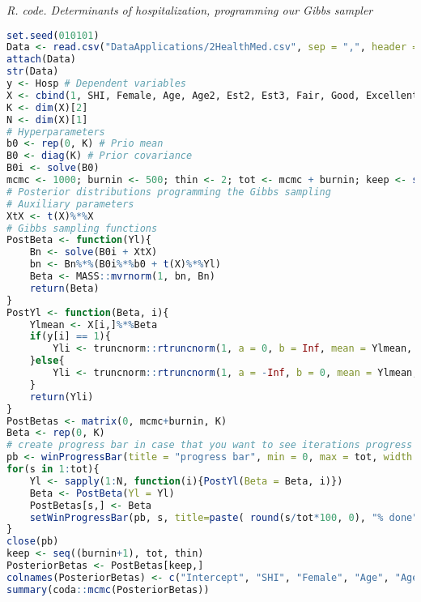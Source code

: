 \begin{enumerate}[leftmargin=*]
\begin{tcolorbox}[enhanced,width=4.67in,center upper,
	fontupper=\large\bfseries,drop shadow southwest,sharp corners]
	\textit{R. code. Determinants of hospitalization, programming our Gibbs sampler}
	\begin{VF}
		\begin{lstlisting}[language=R]
set.seed(010101)
Data <- read.csv("DataApplications/2HealthMed.csv", sep = ",", header = TRUE, fileEncoding = "latin1")
attach(Data)
str(Data)
y <- Hosp # Dependent variables
X <- cbind(1, SHI, Female, Age, Age2, Est2, Est3, Fair, Good, Excellent) # Regressors
K <- dim(X)[2] 
N <- dim(X)[1]
# Hyperparameters
b0 <- rep(0, K) # Prio mean
B0 <- diag(K) # Prior covariance
B0i <- solve(B0)
mcmc <- 1000; burnin <- 500; thin <- 2; tot <- mcmc + burnin; keep <- seq(burnin, tot, thin)
# Posterior distributions programming the Gibbs sampling
# Auxiliary parameters
XtX <- t(X)%*%X
# Gibbs sampling functions
PostBeta <- function(Yl){
	Bn <- solve(B0i + XtX)
	bn <- Bn%*%(B0i%*%b0 + t(X)%*%Yl)
	Beta <- MASS::mvrnorm(1, bn, Bn)
	return(Beta)
}
PostYl <- function(Beta, i){
	Ylmean <- X[i,]%*%Beta
	if(y[i] == 1){
		Yli <- truncnorm::rtruncnorm(1, a = 0, b = Inf, mean = Ylmean, sd = 1)
	}else{
		Yli <- truncnorm::rtruncnorm(1, a = -Inf, b = 0, mean = Ylmean, sd = 1)
	}
	return(Yli)
}
PostBetas <- matrix(0, mcmc+burnin, K)
Beta <- rep(0, K)
# create progress bar in case that you want to see iterations progress
pb <- winProgressBar(title = "progress bar", min = 0, max = tot, width = 300)
for(s in 1:tot){
	Yl <- sapply(1:N, function(i){PostYl(Beta = Beta, i)})
	Beta <- PostBeta(Yl = Yl)
	PostBetas[s,] <- Beta
	setWinProgressBar(pb, s, title=paste( round(s/tot*100, 0), "% done"))	
}
close(pb)
keep <- seq((burnin+1), tot, thin)
PosteriorBetas <- PostBetas[keep,]
colnames(PosteriorBetas) <- c("Intercept", "SHI", "Female", "Age", "Age2", "Est2", "Est3", "Fair", "Good", "Excellent")
summary(coda::mcmc(PosteriorBetas))
\end{lstlisting}
	\end{VF}
\end{tcolorbox} 

       
	
\end{enumerate}